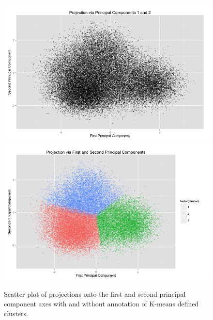 \documentclass[english]{article}\usepackage{graphicx, color}
\numberwithin{equation}{section}
\numberwithin{figure}{section}
\begin{document}
\begin{figure}
\begin{center}
\includegraphics[scale = .3]{PCA12bw.png}
\includegraphics[scale = .3]{PCA12c.png}
\end{center}
\caption{Scatter plot of projections onto the first and second principal component axes with and without annotation of K-means defined clusters.}
\end{figure}
\end{document}
